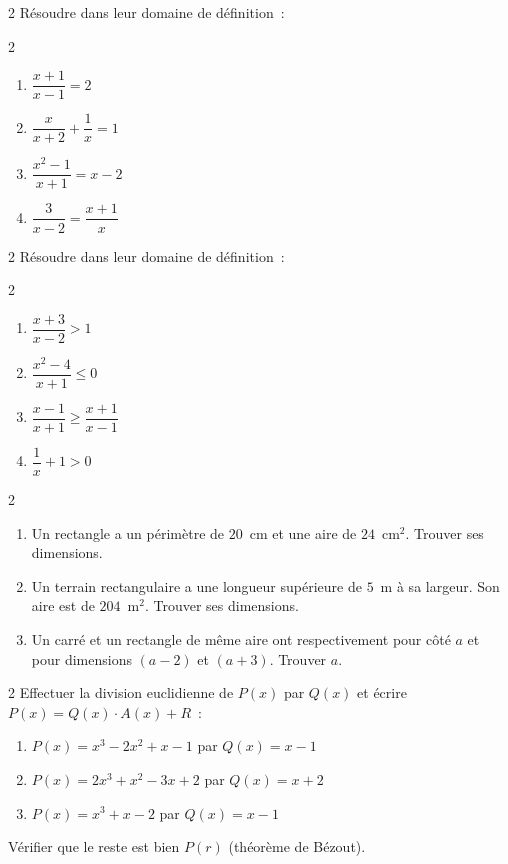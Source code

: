 \begin{exo}{2}
R\'esoudre dans leur domaine de d\'efinition~:
\begin{multicols}{2}
\begin{enumerate}
  \item $\dfrac{x+1}{x-1} = 2$
  \item $\dfrac{x}{x+2} + \dfrac{1}{x} = 1$
  \item $\dfrac{x^2-1}{x+1} = x-2$
  \item $\dfrac{3}{x-2} = \dfrac{x+1}{x}$
\end{enumerate}
\end{multicols}
\end{exo}

\begin{exo}{2}
R\'esoudre dans leur domaine de d\'efinition~:
\begin{multicols}{2}
\begin{enumerate}
  \item $\dfrac{x+3}{x-2} > 1$
  \item $\dfrac{x^2-4}{x+1} \leq 0$
  \item $\dfrac{x-1}{x+1} \geq \dfrac{x+1}{x-1}$
  \item $\dfrac{1}{x} + 1 > 0$
\end{enumerate}
\end{multicols}
\end{exo}

\begin{exo}{2}
\begin{enumerate}
  \item Un rectangle a un p\'erim\`etre de $20$~cm et une aire de $24$~cm$^2$.
        Trouver ses dimensions.
  \item Un terrain rectangulaire a une longueur sup\'erieure de $5$~m
        \`a sa largeur. Son aire est de $204$~m$^2$. Trouver ses dimensions.
  \item Un carr\'e et un rectangle de m\^eme aire ont respectivement
        pour c\^ot\'e $a$ et pour dimensions $(a-2)$ et $(a+3)$.
        Trouver $a$.
\end{enumerate}
\end{exo}

\begin{exo}{2}
Effectuer la division euclidienne de $P(x)$ par $Q(x)$
et \'ecrire $P(x) = Q(x)\cdot A(x) + R$~:
\begin{enumerate}
  \item $P(x) = x^3 - 2x^2 + x - 1$ par $Q(x) = x - 1$
  \item $P(x) = 2x^3 + x^2 - 3x + 2$ par $Q(x) = x + 2$
  \item $P(x) = x^3 + x - 2$ par $Q(x) = x - 1$
\end{enumerate}
V\'erifier que le reste est bien $P(r)$ (th\'eor\`eme de B\'ezout).
\end{exo}

